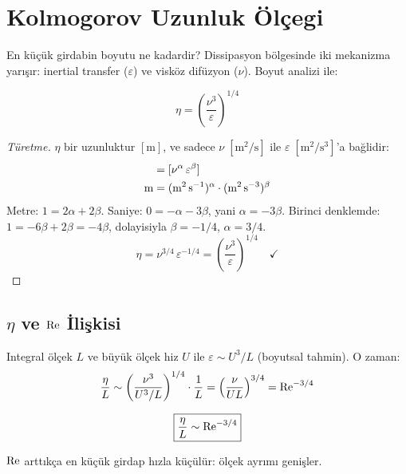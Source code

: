 \section{Kolmogorov Uzunluk Ölçegi}
\label{sec:kolmogorov_scale}

En küçük girdabin boyutu ne kadardir? Dissipasyon bölgesinde iki mekanizma yarışır: inertial transfer ($\varepsilon$) ve visköz difüzyon ($\nu$). Boyut analizi ile:

\begin{equation}
\eta = \left(\frac{\nu^3}{\varepsilon}\right)^{1/4}
\label{eq:kolmogorov_eta}
\end{equation}

\begin{proof}[Türetme]
$\eta$ bir uzunluktur $[\text{m}]$, ve sadece $\nu\;[\text{m}^2/\text{s}]$ ile $\varepsilon\;[\text{m}^2/\text{s}^3]$'a bağlidir:
\begin{align}
[\eta] &= [\nu^\alpha\,\varepsilon^\beta] \notag \\
\text{m} &= (\text{m}^2\,\text{s}^{-1})^\alpha \cdot (\text{m}^2\,\text{s}^{-3})^\beta
\end{align}
Metre: $1 = 2\alpha + 2\beta$. Saniye: $0 = -\alpha - 3\beta$, yani $\alpha = -3\beta$. Birinci denklemde: $1 = -6\beta + 2\beta = -4\beta$, dolayisiyla $\beta = -1/4$, $\alpha = 3/4$.
\begin{equation}
\eta = \nu^{3/4}\,\varepsilon^{-1/4} = \left(\frac{\nu^3}{\varepsilon}\right)^{1/4} \quad\checkmark
\end{equation}
\end{proof}

\subsection{$\eta$ ve $\mathrm{Re}$ İlişkisi}

Integral ölçek $L$ ve büyük ölçek hiz $U$ ile $\varepsilon \sim U^3/L$ (boyutsal tahmin). O zaman:
\begin{equation}
\frac{\eta}{L} \sim \left(\frac{\nu^3}{U^3/L}\right)^{1/4}\cdot\frac{1}{L} = \left(\frac{\nu}{UL}\right)^{3/4} = \mathrm{Re}^{-3/4}
\label{eq:eta_over_L}
\end{equation}

\begin{equation}
\boxed{\frac{\eta}{L} \sim \mathrm{Re}^{-3/4}}
\end{equation}

$\mathrm{Re}$ arttıkça en küçük girdap hızla küçülür: ölçek ayrımı genişler.


